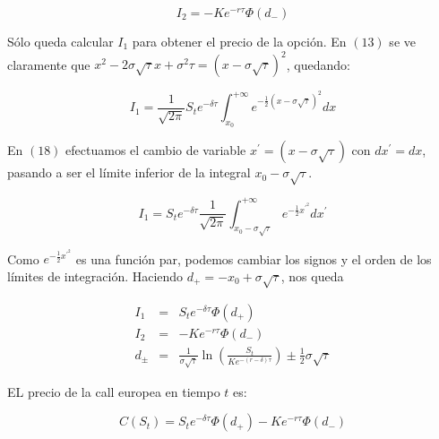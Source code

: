 \documentclass[12pt]{article}
\begin{document}
\begin{equation}
	I_{2} = -Ke^{-r\tau}\Phi\left(d_{-}\right)
\end{equation}

S\'{o}lo queda calcular $I_{1}$ para obtener el precio de la opci\'{o}n. En $(13)$ se ve claramente que $x^{2}-2\sigma\sqrt{\tau}x+
\sigma^{2}\tau=\left(x-\sigma\sqrt{\tau}\right)^{2}$, quedando:
\newline

\begin{equation}
	I_{1} = \frac{1}{\sqrt{2\pi}}S_{t}e^{-\delta\tau}\int_{x_{0}}^{+\infty}e^{-\frac{1}{2}\left(x-\sigma\sqrt{\tau}\right)^{2}}dx
\end{equation}
\newline

En $(18)$ efectuamos el cambio de variable $x^{'}=\left(x-\sigma\sqrt{\tau}\right)$ con $dx^{'}=dx$, pasando a ser el l\'{i}mite 
inferior de la integral $x_{0}-\sigma\sqrt{\tau}$.
\newline

\begin{equation}
	I_{1}  	 =  S_{t}e^{-\delta\tau}\frac{1}{\sqrt{2\pi}}\int_{x_{0}-\sigma\sqrt{\tau}}^{+\infty}
			e^{-\frac{1}{2}x^{'^{2}}}dx^{'}
\end{equation}
\newline

Como $e^{-\frac{1}{2}x^{'^{2}}}$ es una funci\'{o}n par, podemos cambiar los signos y el orden de los l\'{i}mites de integraci\'{o}n. Haciendo
$d_{+}=-x_{0}+\sigma\sqrt{\tau}$, nos queda
\newline

\begin{eqnarray}
	I_{1} & = & S_{t}e^{-\delta\tau}\Phi\left(d_{+}\right) \nonumber \\
	I_{2} & = & -Ke^{-r\tau}\Phi\left(d_{-}\right) \nonumber \\
	d_{\pm} & = & \frac{1}{\sigma\sqrt{\tau}}\ln\left(\frac{S_{t}}{Ke^{-\left(r-\delta\right)\tau}}\right)\pm
			\frac{1}{2}\sigma\sqrt{\tau}
\end{eqnarray}
\newline

EL precio de la call europea en tiempo $t$ es:
\newline

\begin{equation}
	C\left(S_{t}\right) = S_{t}e^{-\delta\tau}\Phi\left(d_{+}\right) - Ke^{-r\tau}\Phi\left(d_{-}\right)
\end{equation}
\newline
\end{document}
